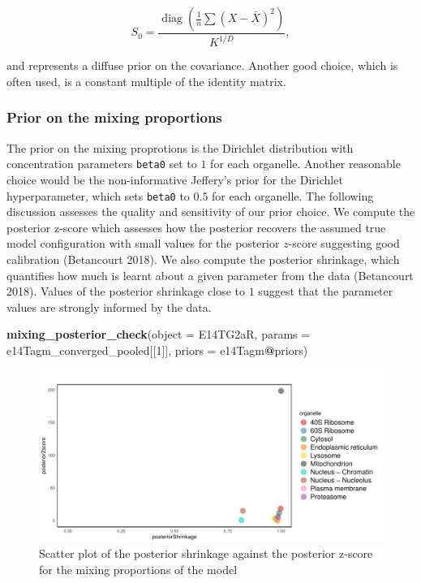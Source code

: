 \documentclass[
]{article}
\newenvironment{Shaded}{\begin{snugshade}}{\end{snugshade}}
\newcommand{\DataTypeTok}[1]{\textcolor[rgb]{0.13,0.29,0.53}{#1}}
\newcommand{\DecValTok}[1]{\textcolor[rgb]{0.00,0.00,0.81}{#1}}
\newcommand{\KeywordTok}[1]{\textcolor[rgb]{0.13,0.29,0.53}{\textbf{#1}}}
\newcommand{\NormalTok}[1]{#1}
\newcommand{\OperatorTok}[1]{\textcolor[rgb]{0.81,0.36,0.00}{\textbf{#1}}}
\begin{document}
\begin{equation}
S_0 = \frac{\mathop{\mathrm{diag}}(\frac{1}{n}\sum (X - \bar{X})^2)}{K^{1/D}},
\end{equation}

and represents a diffuse prior on the covariance. Another good choice,
which is often used, is a constant multiple of the identity matrix.

\hypertarget{prior-on-the-mixing-proportions}{%
\subsubsection{Prior on the mixing
proportions}\label{prior-on-the-mixing-proportions}}

The prior on the mixing proprotions is the Dirichlet distribution with
concentration parameters \texttt{beta0} set to \(1\) for each organelle.
Another reasonable choice would be the non-informative Jeffery's prior
for the Dirichlet hyperparameter, which sets \texttt{beta0} to \(0.5\)
for each organelle. The following discussion assesses the quality and
sensitivity of our prior choice. We compute the posterior z-score which
assesses how the posterior recovers the assumed true model configuration
with small values for the posterior \(z\)-score suggesting good
calibration (Betancourt 2018). We also compute the posterior shrinkage,
which quantifies how much is learnt about a given parameter from the
data (Betancourt 2018). Values of the posterior shrinkage close to \(1\)
suggest that the parameter values are strongly informed by the data.

\begin{Shaded}
\begin{Highlighting}[]
\KeywordTok{mixing_posterior_check}\NormalTok{(}\DataTypeTok{object =}\NormalTok{ E14TG2aR, }\DataTypeTok{params =}\NormalTok{ e14Tagm_converged_pooled[[}\DecValTok{1}\NormalTok{]], }\DataTypeTok{priors =}\NormalTok{ e14Tagm}\OperatorTok{@}\NormalTok{priors)}
\end{Highlighting}
\end{Shaded}

\begin{figure}
\includegraphics[width=0.7\linewidth]{F1000TAGMworkflow_rev1_files/figure-latex/unnamed-chunk-16-1} \caption{Scatter plot of the posterior shrinkage against the posterior z-score for the mixing proportions of the model}\label{fig:unnamed-chunk-16}
\end{figure}
\end{document}
